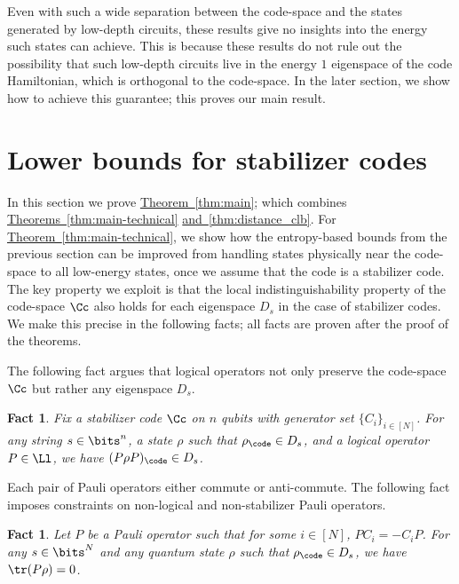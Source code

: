 \documentclass[11pt]{article}
\newcommand{\expref}[2]{\texorpdfstring{\hyperref[#2]{#1~\ref{#2}}}{#1~\ref{#2}}}
\newtheorem{fact}[theorem]{Fact}
\begin{document}
Even with such a wide separation between the code-space and the states generated by low-depth circuits,
%
these results give no insights into the energy such states can achieve. This is because these results do not rule out the possibility that such low-depth circuits
%
live in the energy $1$ eigenspace of the code Hamiltonian, which is orthogonal to the code-space. In the later section, we show how to achieve this guarantee; this proves our main result.



\section{Lower bounds for stabilizer codes}
\label{sec:main}

In this section we prove \expref{Theorem}{thm:main}; {which combines \expref{Theorems}{thm:main-technical} \expref{and}{thm:distance_clb}. For \expref{Theorem}{thm:main-technical}}, we show how the entropy-based bounds from the previous section can be improved from handling states physically near the code-space to all low-energy states, once we assume that the code is a stabilizer code. The key property we exploit is that the local indistinguishability property of the code-space $\Cc$ also holds for each eigenspace $D_s$ in the case of stabilizer codes. We make this precise in the following facts; all facts are proven after the proof of the theorems.

The following fact argues that logical operators not only preserve the code-space $\Cc$ but rather any eigenspace $D_s$.

\begin{fact}
\label{fact:logact}
Fix a stabilizer code $\Cc$ on $n$ qubits with generator set $\{C_i\}_{i \in [N]}$. For any string $s \in \bits^{n}$, a state $\rho$ such that $\rho_\code \in D_s$, and a logical operator $P \in \Ll$, we have $(P\rho P)_{\code} \in D_s$.
\end{fact}

Each pair of Pauli operators either commute or anti-commute. The following fact imposes constraints on non-logical and non-stabilizer Pauli operators.

\begin{fact}
\label{fact:zeroexp}
Let $P$ be a Pauli operator such that for some $i \in [N]$, $P C_i = - C_i P$. For any $s \in \bits^{N}$ and any quantum state $\rho$ such that $\rho_\code \in D_s$, we have $\tr(P \rho) = 0$.
\end{fact}
\end{document}
